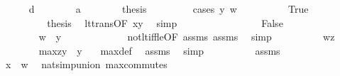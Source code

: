 \begin{isabellebody}
\ \ \ \ \ \ \isamarkupfalse%
\ d\isanewline
\ \ \ \ \ \ \isamarkupfalse%
\ a\isanewline
\ \ \ \ \ \ \isamarkupfalse%
\ {\isacharquery}{\kern0pt}thesis\ \isanewline
\ \ \ \ \ \ \isamarkupfalse%
\ {\isacharparenleft}{\kern0pt}cases\ {\isachardoublequoteopen}y\ {\isacharless}{\kern0pt}w{\isachardoublequoteclose}{\isacharparenright}{\kern0pt}\isanewline
\ \ \ \ \ \ \ \ \isamarkupfalse%
\ True\ \ \ \ \ \ \ \isanewline
\ \ \ \ \ \ \ \ \isamarkupfalse%
\ \isamarkupfalse%
\ {\isacharquery}{\kern0pt}thesis\ \isamarkupfalse%
\ lt{\isacharunderscore}{\kern0pt}trans{\isacharbrackleft}{\kern0pt}OF\ {\isacartoucheopen}x{\isacharless}{\kern0pt}y{\isacartoucheclose}{\isacharbrackright}{\kern0pt}\ \isamarkupfalse%
\ simp\isanewline
\ \ \ \ \ \ \isamarkupfalse%
\isanewline
\ \ \ \ \ \ \ \ \isamarkupfalse%
\ False\isanewline
\ \ \ \ \ \ \ \ \isamarkupfalse%
\isanewline
\ \ \ \ \ \ \ \ \isamarkupfalse%
\ {\isachardoublequoteopen}w\ {\isasymle}\ y{\isachardoublequoteclose}\ \isanewline
\ \ \ \ \ \ \ \ \ \ \isamarkupfalse%
\ not{\isacharunderscore}{\kern0pt}lt{\isacharunderscore}{\kern0pt}iff{\isacharunderscore}{\kern0pt}le{\isacharbrackleft}{\kern0pt}OF\ assms{\isacharparenleft}{\kern0pt}{}{\isacharparenright}{\kern0pt}\ assms{\isacharparenleft}{\kern0pt}{}{\isacharparenright}{\kern0pt}{\isacharbrackright}{\kern0pt}\ \isamarkupfalse%
\ simp\isanewline
\ \ \ \ \ \ \ \ \isamarkupfalse%
\ {\isacartoucheopen}w{\isacharequal}{\kern0pt}z{\isacartoucheclose}\isanewline
\ \ \ \ \ \ \ \ \isamarkupfalse%
\ {\isachardoublequoteopen}max{\isacharparenleft}{\kern0pt}z{\isacharcomma}{\kern0pt}y{\isacharparenright}{\kern0pt}\ {\isacharequal}{\kern0pt}\ y{\isachardoublequoteclose}\ \ \isamarkupfalse%
\ max{\isacharunderscore}{\kern0pt}def\ \isamarkupfalse%
\ assms\ \isamarkupfalse%
\ simp\isanewline
\ \ \ \ \ \ \ \ \isamarkupfalse%
\ assms\isanewline
\ \ \ \ \ \ \ \ \isamarkupfalse%
\ {\isachardoublequoteopen}{\isachardot}{\kern0pt}{\isachardot}{\kern0pt}{\isachardot}{\kern0pt}\ {\isacharequal}{\kern0pt}\ x\ {\isasymunion}\ w{\isachardoublequoteclose}\ \isamarkupfalse%
\ nat{\isacharunderscore}{\kern0pt}simp{\isacharunderscore}{\kern0pt}union\ max{\isacharunderscore}{\kern0pt}commutes\ \ \isamarkupfalse%

\end{isabellebody}
